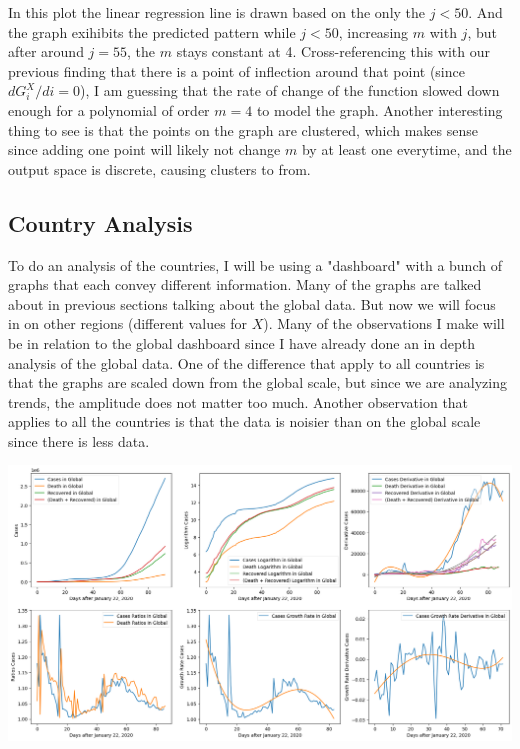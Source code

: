 \documentclass{report}
\begin{document}
                In this plot the linear regression line is drawn based on the only the $j < 50$. And the graph exihibits the predicted pattern while $j < 50$, increasing $m$ with $j$, but after around $j = 55$, the $m$ stays constant at 4. Cross-referencing this with our previous finding that there is a point of inflection around that point (since $dG^X_i/di = 0$), I am guessing that the rate of change of the function slowed down enough for a polynomial of order $m = 4$ to model the graph.
                \newline\indent
                Another interesting thing to see is that the points on the graph are clustered, which makes sense since adding one point will likely not change $m$ by at least one everytime, and the output space is discrete, causing clusters to from. 
        \subsection{Country Analysis}
        \label{sec:country}
            To do an analysis of the countries, I will be using a "dashboard" with a bunch of graphs that each convey different information. Many of the graphs are talked about in previous sections talking about the global data. But now we will focus in on other regions (different values for $X$).
            \newline\indent
            Many of the observations I make will be in relation to the global dashboard since I have already done an in depth analysis of the global data. One of the difference that apply to all countries is that the graphs are scaled down from the global scale, but since we are analyzing trends, the amplitude does not matter too much. Another observation that applies to all the countries is that the data is noisier than on the global scale since there is less data.
            \begin{center}
                \includegraphics[width=\textwidth]{plots/global/analyze.png}
            \end{center}
\end{document}
